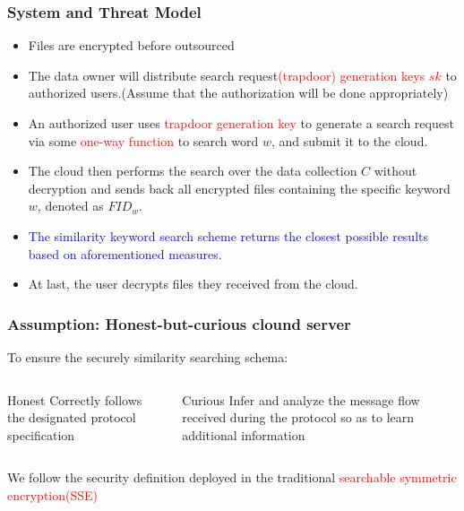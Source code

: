 \documentclass{beamer}
\begin{document}
\begin{frame}
	\frametitle{System and Threat Model}
	\begin{itemize}
		\item Files are encrypted before outsourced
		\item The data owner will distribute search request\textcolor{red}{(trapdoor) generation keys $sk$} to authorized users.(Assume that the authorization will be done appropriately)
		\item An authorized user uses \textcolor{red}{trapdoor generation key} to generate a search request via some \textcolor{red}{one-way function} to search word $w$, and submit it to the cloud.
		\item The cloud then performs the search over the data
		collection $C$ without decryption and sends back all encrypted files containing the specific keyword $w$, denoted as $FI{D_w}$.
		\item \textcolor{blue} {The
		similarity keyword search scheme returns the closest possible results based on aforementioned measures.}
		\item At last, the user decrypts files they received from the cloud.
	\end{itemize}
\end{frame}

\begin{frame}
	\frametitle{Assumption: Honest-but-curious clound server}
    To ensure the securely similarity searching schema:
    \begin{columns}[t] 
    \begin{block}{Honest}
    	Correctly follows the designated protocol specification
    \end{block}
        \begin{alertblock}{Curious}
        	Infer and analyze the message flow received during the protocol so as to learn additional information
        \end{alertblock}
    \end{columns}
    \begin{columns}
    \begin{exampleblock}{}
        We follow the security definition
        deployed in the traditional  \textcolor{red} {searchable symmetric encryption(SSE)}
    \end{exampleblock}
\end{columns}
\end{frame}
\end{document}
